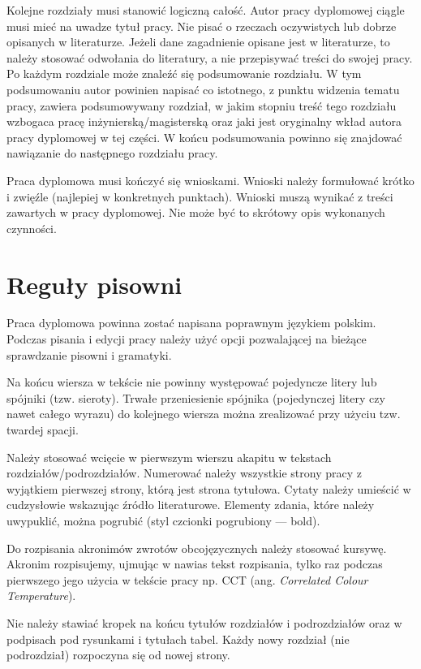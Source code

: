 Kolejne rozdziały musi stanowić logiczną całość. Autor pracy dyplomowej ciągle
musi mieć na uwadze tytuł pracy. Nie pisać o rzeczach oczywistych lub dobrze opisanych w literaturze. Jeżeli dane zagadnienie opisane jest w literaturze, to należy stosować odwołania do literatury, a nie przepisywać treści do swojej pracy. Po każdym rozdziale może znaleźć się podsumowanie rozdziału. W tym podsumowaniu autor powinien napisać co istotnego, z punktu widzenia tematu pracy, zawiera podsumowywany rozdział, w jakim stopniu treść tego rozdziału wzbogaca pracę inżynierską/magisterską oraz jaki jest oryginalny wkład autora pracy dyplomowej w tej części. W końcu podsumowania powinno się znajdować nawiązanie do następnego rozdziału pracy.

Praca dyplomowa musi kończyć się wnioskami. Wnioski należy formułować krótko
i zwięźle (najlepiej w konkretnych punktach). Wnioski muszą wynikać z treści zawartych w pracy dyplomowej. Nie może być to skrótowy opis wykonanych czynności.






\section{Reguły pisowni}

Praca dyplomowa powinna zostać napisana poprawnym językiem polskim. Podczas pisania i edycji pracy należy użyć opcji pozwalającej na bieżące sprawdzanie pisowni i gramatyki.

Na końcu wiersza w tekście nie powinny występować pojedyncze litery lub spójniki
(tzw. sieroty). Trwałe przeniesienie spójnika (pojedynczej litery czy nawet całego wyrazu) do kolejnego wiersza można zrealizować przy użyciu tzw. twardej spacji.

Należy stosować wcięcie w pierwszym wierszu akapitu w tekstach
rozdziałów/podrozdziałów. Numerować należy wszystkie strony pracy z wyjątkiem pierwszej strony, którą jest strona tytułowa.
Cytaty należy umieścić w cudzysłowie wskazując źródło literaturowe.
Elementy zdania, które należy uwypuklić, można pogrubić (styl czcionki pogrubiony — bold).

Do rozpisania akronimów zwrotów obcojęzycznych należy stosować kursywę.
Akronim rozpisujemy, ujmując w nawias tekst rozpisania, tylko raz podczas
pierwszego jego użycia w tekście pracy np. CCT (ang. \textit{Correlated Colour
Temperature}).


Nie należy stawiać kropek na końcu tytułów rozdziałów i podrozdziałów
oraz w podpisach pod rysunkami i tytułach tabel.
Każdy nowy rozdział (nie podrozdział) rozpoczyna się od nowej strony.

